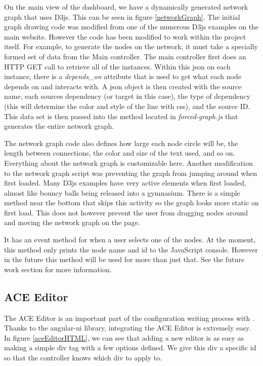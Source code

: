 On the main view of the dashboard, we have a dynamically generated network graph that uses D3js. This can be seen in figure \ref{networkGraph}. The initial graph drawing code was modified from one of the numerous D3js examples on the main website. However the code has been modified to work within the project itself. For example, to generate the nodes on the network, it must take a specially formed set of data from the Main controller. The main controller first does an HTTP GET call to retrieve all of the instances. Within this json on each instance, there is a \emph{depends\_on} attribute that is used to get what each node depends on and interacts with. A json object is then created with the source name, each sources dependency (or target in this case), the type of dependency (this will determine the color and style of the line with css), and the source ID. This data set is then passed into the method located in \emph{forced-graph.js} that generates the entire network graph.

The network graph code also defines how large each node circle will be, the length between connections, the color and size of the text used, and so on. Everything about the network graph is customizable here. Another modification to the network graph script was preventing the graph from jumping around when first loaded. Many D3js examples have very active elements when first loaded, almost like bouncy balls being released into a gymnasium. There is a simple method near the bottom that skips this activity so the graph looks more static on first load. This does not however prevent the user from dragging nodes around and moving the network graph on the page.

It has an event method for when a user selects one of the nodes. At the moment, this method only prints the node name and id to the JavaScript console. However in the future this method will be used for more than just that. See the future work section for more information.

\subsection{ACE Editor}


The ACE Editor is an important part of the configuration writing process with \projectName{}. Thanks to the angular-ui library, integrating the ACE Editor is extremely easy. In figure \ref{aceEditorHTML}, we can see that adding a new editor is as easy as making a simple div tag with a few options defined. We give this div a specific id so that the controller knows which div to apply to.

